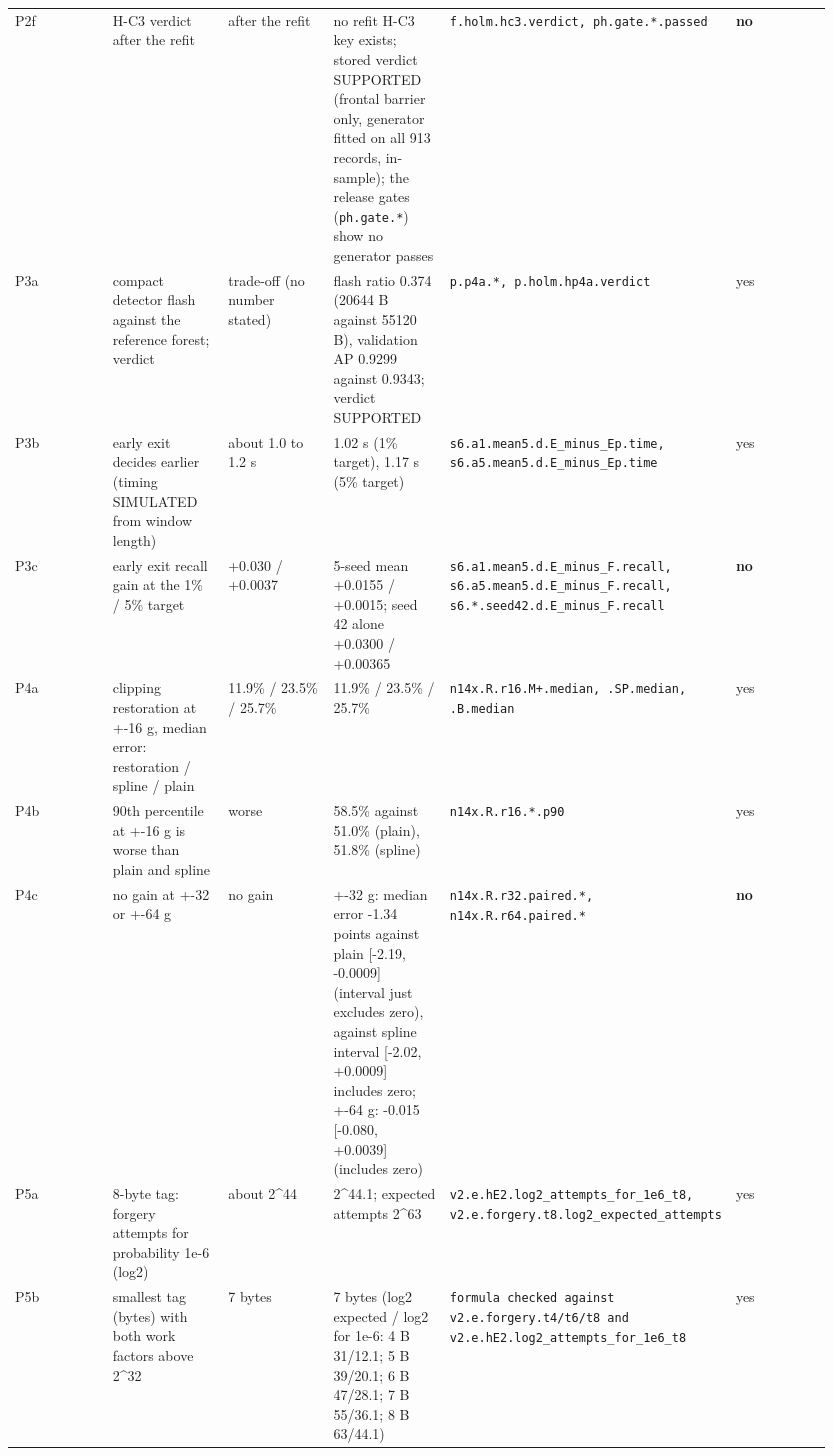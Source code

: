 {\begin{longtable}{p{0.158\linewidth}p{0.158\linewidth}p{0.158\linewidth}p{0.158\linewidth}p{0.158\linewidth}p{0.158\linewidth}}
P2f & H-C3 verdict after the refit & after the refit & no refit H-C3 key exists; stored verdict SUPPORTED (frontal barrier only, generator fitted on all 913 records, in-sample); the release gates (\texttt{ph.gate.*}) show no generator passes & \texttt{f.holm.hc3.verdict, ph.gate.*.passed} & \textbf{no} \\
P3a & compact detector flash against the reference forest; verdict & trade-off (no number stated) & flash ratio 0.374 (20644 B against 55120 B), validation AP 0.9299 against 0.9343; verdict SUPPORTED & \texttt{p.p4a.*, p.holm.hp4a.verdict} & yes \\
P3b & early exit decides earlier (timing SIMULATED from window length) & about 1.0 to 1.2 s & 1.02 s (1\% target), 1.17 s (5\% target) & \texttt{s6.a1.mean5.d.E\_minus\_Ep.time, s6.a5.mean5.d.E\_minus\_Ep.time} & yes \\
P3c & early exit recall gain at the 1\% / 5\% target & +0.030 / +0.0037 & 5-seed mean +0.0155 / +0.0015; seed 42 alone +0.0300 / +0.00365 & \texttt{s6.a1.mean5.d.E\_minus\_F.recall, s6.a5.mean5.d.E\_minus\_F.recall, s6.*.seed42.d.E\_minus\_F.recall} & \textbf{no} \\
P4a & clipping restoration at +-16 g, median error: restoration / spline / plain & 11.9\% / 23.5\% / 25.7\% & 11.9\% / 23.5\% / 25.7\% & \texttt{n14x.R.r16.M+.median, .SP.median, .B.median} & yes \\
P4b & 90th percentile at +-16 g is worse than plain and spline & worse & 58.5\% against 51.0\% (plain), 51.8\% (spline) & \texttt{n14x.R.r16.*.p90} & yes \\
P4c & no gain at +-32 or +-64 g & no gain & +-32 g: median error -1.34 points against plain [-2.19, -0.0009] (interval just excludes zero), against spline interval [-2.02, +0.0009] includes zero; +-64 g: -0.015 [-0.080, +0.0039] (includes zero) & \texttt{n14x.R.r32.paired.*, n14x.R.r64.paired.*} & \textbf{no} \\
P5a & 8-byte tag: forgery attempts for probability 1e-6 (log2) & about 2\textasciicircum{}44 & 2\textasciicircum{}44.1; expected attempts 2\textasciicircum{}63 & \texttt{v2.e.hE2.log2\_attempts\_for\_1e6\_t8, v2.e.forgery.t8.log2\_expected\_attempts} & yes \\
P5b & smallest tag (bytes) with both work factors above 2\textasciicircum{}32 & 7 bytes & 7 bytes (log2 expected / log2 for 1e-6: 4 B 31/12.1; 5 B 39/20.1; 6 B 47/28.1; 7 B 55/36.1; 8 B 63/44.1) & \texttt{formula checked against v2.e.forgery.t4/t6/t8 and v2.e.hE2.log2\_attempts\_for\_1e6\_t8} & yes \\

\end{longtable}}
